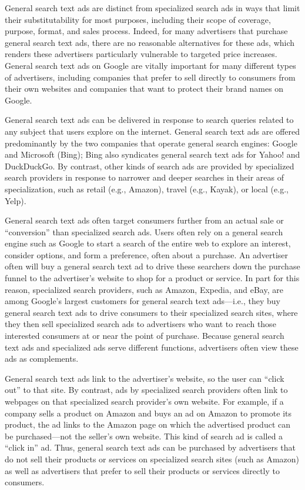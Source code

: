 \documentclass[11pt,b5paper,headings=small]{scrartcl}
\begin{document}

General search text ads are distinct from specialized search ads in ways that limit
their substitutability for most purposes, including their scope of coverage, purpose, format, and
sales process. Indeed, for many advertisers that purchase general search text ads, there are no
reasonable alternatives for these ads, which renders these advertisers particularly vulnerable to
targeted price increases. General search text ads on Google are vitally important for many
different types of advertisers, including companies that prefer to sell directly to consumers from
their own websites and companies that want to protect their brand names on Google.


General search text ads can be delivered in response to search queries related to
any subject that users explore on the internet. General search text ads are offered predominantly
by the two companies that operate general search engines: Google and Microsoft (Bing); Bing
also syndicates general search text ads for Yahoo! and DuckDuckGo. By contrast, other kinds of
search ads are provided by specialized search providers in response to narrower and deeper
searches in their areas of specialization, such as retail (e.g., Amazon), travel (e.g., Kayak), or
local (e.g., Yelp).


General search text ads often target consumers further from an actual sale or
“conversion” than specialized search ads. Users often rely on a general search engine such as
Google to start a search of the entire web to explore an interest, consider options, and form a
preference, often about a purchase. An advertiser often will buy a general search text ad to drive
these searchers down the purchase funnel to the advertiser’s website to shop for a product or
service. In part for this reason, specialized search providers, such as Amazon, Expedia, and
eBay, are among Google’s largest customers for general search text ads—i.e., they buy general
search text ads to drive consumers to their specialized search sites, where they then sell
specialized search ads to advertisers who want to reach those interested consumers at or near the
point of purchase. Because general search text ads and specialized ads serve different functions,
advertisers often view these ads as complements.


General search text ads link to the advertiser’s website, so the user can “click out”
to that site. By contrast, ads by specialized search providers often link to webpages on that
specialized search provider’s own website. For example, if a company sells a product on
Amazon and buys an ad on Amazon to promote its product, the ad links to the Amazon page on
which the advertised product can be purchased—not the seller’s own website. This kind of
search ad is called a “click in” ad. Thus, general search text ads can be purchased by advertisers
that do not sell their products or services on specialized search sites (such as Amazon) as well as
advertisers that prefer to sell their products or services directly to consumers.
\end{document}
